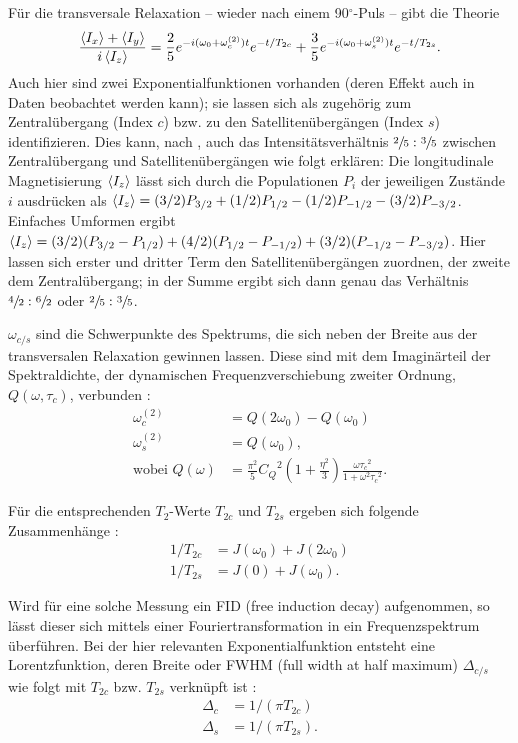 Für die transversale Relaxation -- wieder nach einem 90$^\circ$-Puls -- gibt die Theorie \cite{werbelow}
\begin{align}
    \frac{\Braket{I_x} + \Braket{I_y}}{i\Braket{I_z}} = \frac{2}{5}e^{-i(\omega_0 + \omega_c^{(2)})t}e^{-t/T_{2c}} + \frac{3}{5}e^{-i(\omega_0 + \omega_s^{(2)})t}e^{-t/T_{2s}}. \label{eqn:trans_relax}
\end{align}
Auch hier sind zwei Exponentialfunktionen vorhanden (deren Effekt auch in Daten beobachtet werden kann); sie lassen sich als zugehörig zum Zentralübergang (Index $c$) bzw. zu den Satellitenübergängen (Index $s$) identifizieren. Dies kann, nach \cite{werbelow}, auch das Intensitätsverhältnis $\sfrac{2}{5}:\sfrac{3}{5}$ zwischen Zentralübergang und Satellitenübergängen wie folgt erklären: Die longitudinale Magnetisierung $\Braket{I_z}$ lässt sich durch die Populationen $P_i$ der jeweiligen Zustände $i$ ausdrücken als $\Braket{I_z} = (3/2)P_{3/2} + (1/2)P_{1/2} - (1/2)P_{-1/2} - (3/2)P_{-3/2}$. Einfaches Umformen ergibt $\Braket{I_z} = (3/2)(P_{3/2} - P_{1/2}) + (4/2)(P_{1/2} - P_{-1/2}) + (3/2)(P_{-1/2} - P_{-3/2})$. Hier lassen sich erster und dritter Term den Satellitenübergängen zuordnen, der zweite dem Zentralübergang; in der Summe ergibt sich dann genau das Verhältnis $\sfrac{4}{2}:\sfrac{6}{2}$ oder $\sfrac{2}{5}:\sfrac{3}{5}$.

$\omega_{c/s}$ sind die Schwerpunkte des Spektrums, die sich neben der Breite aus der transversalen Relaxation gewinnen lassen. Diese sind mit dem Imaginärteil der Spektraldichte, der dynamischen Frequenzverschiebung zweiter Ordnung, $Q(\omega, \tau_c)$, verbunden \cite{eckert}:
\begin{align}
    \omega_c^{(2)} &= Q(2\omega_0) - Q(\omega_0) \\ \label{eqn:schwerpunkt}
    \omega_s^{(2)} &= Q(\omega_0), \\
    \text{wobei } Q(\omega) &= \frac{\pi^2}{5} {C_Q}^2 \left( 1 + \frac{\eta^2}{3} \right) \frac{\omega {\tau_c}^2}{1 + \omega^2 {\tau_c}^2}.
\end{align}

Für die entsprechenden $T_2$-Werte $T_{2c}$ und $T_{2s}$ ergeben sich folgende Zusammenhänge \cite{eckert}:
\begin{align}
    1/T_{2c} &= J(\omega_0) + J(2\omega_0) \label{eqn:theo:T_2_dyn} \\
    1/T_{2s} &= J(0) + J(\omega_0).
\end{align}

Wird für eine solche Messung ein FID (free induction decay) aufgenommen, so lässt dieser sich mittels einer Fouriertransformation in ein Frequenzspektrum überführen. Bei der hier relevanten Exponentialfunktion entsteht eine Lorentzfunktion, deren Breite oder FWHM (full width at half maximum) $\Delta_{c/s}$ wie folgt mit $T_{2c}$ bzw. $T_{2s}$ verknüpft ist \cite{werbelow}:
\begin{align}
    \Delta_c &= 1/(\pi T_{2c}) \\ \label{eqn:fwhm}
    \Delta_s &= 1/(\pi T_{2s}).
\end{align}

